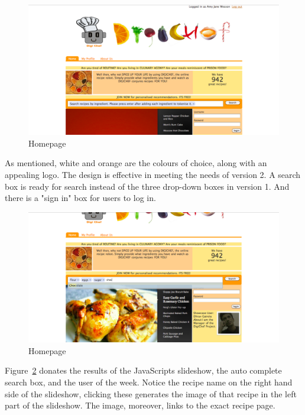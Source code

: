 

\begin{figure}[H]
\includegraphics[width=1\textwidth]{result_index}
\caption{Homepage}
\label{fig:result_index}
\end{figure}

As mentioned, white and orange are the colours of choice, along with an appealing logo. The design is effective in meeting the needs of version 2. A search box is ready for search instead of the three drop-down boxes in version 1. And there is a "sign in" box for users to log in. 

\begin{figure}[H]
\includegraphics[width=1\textwidth]{result_index2}
\caption{Homepage}
\label{fig:result_index2}
\end{figure}

Figure~\ref{fig:result_index2} donates the results of the JavaScripts slideshow, the auto complete search box, and the user of the week. Notice the recipe name on the right hand side of the slideshow, clicking these generates the image of that recipe in the left part of the slideshow. The image, moreover, links to the exact recipe page. 

